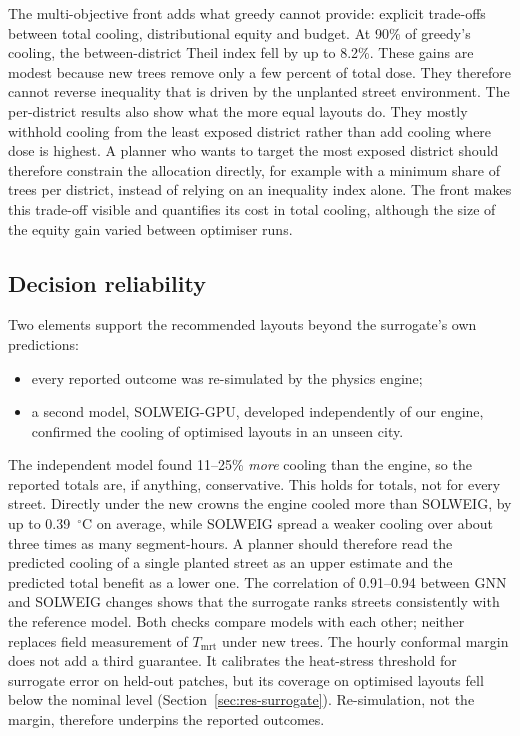 \documentclass[preprint,12pt,authoryear]{elsarticle}
\newcommand{\degC}{\ensuremath{^\circ}C}
\newcommand{\tmrt}{\ensuremath{T_\mathrm{mrt}}}
\begin{document}
The multi-objective front adds what greedy cannot provide: explicit trade-offs between total cooling, distributional equity and budget. At 90\% of greedy's cooling, the between-district Theil index fell by up to 8.2\%. These gains are modest because new trees remove only a few percent of total dose. They therefore cannot reverse inequality that is driven by the unplanted street environment. The per-district results also show what the more equal layouts do. They mostly withhold cooling from the least exposed district rather than add cooling where dose is highest. A planner who wants to target the most exposed district should therefore constrain the allocation directly, for example with a minimum share of trees per district, instead of relying on an inequality index alone. The front makes this trade-off visible and quantifies its cost in total cooling, although the size of the equity gain varied between optimiser runs.

\subsection{Decision reliability}

Two elements support the recommended layouts beyond the surrogate's own predictions:
\begin{itemize}
  \item every reported outcome was re-simulated by the physics engine;
  \item a second model, SOLWEIG-GPU, developed independently of our engine, confirmed the cooling of optimised layouts in an unseen city.
\end{itemize}
The independent model found 11--25\% \emph{more} cooling than the engine, so the reported totals are, if anything, conservative. This holds for totals, not for every street. Directly under the new crowns the engine cooled more than SOLWEIG, by up to 0.39~\degC{} on average, while SOLWEIG spread a weaker cooling over about three times as many segment-hours. A planner should therefore read the predicted cooling of a single planted street as an upper estimate and the predicted total benefit as a lower one. The correlation of 0.91--0.94 between GNN and SOLWEIG changes shows that the surrogate ranks streets consistently with the reference model. Both checks compare models with each other; neither replaces field measurement of \tmrt{} under new trees. The hourly conformal margin does not add a third guarantee. It calibrates the heat-stress threshold for surrogate error on held-out patches, but its coverage on optimised layouts fell below the nominal level (Section~\ref{sec:res-surrogate}). Re-simulation, not the margin, therefore underpins the reported outcomes.
\end{document}
